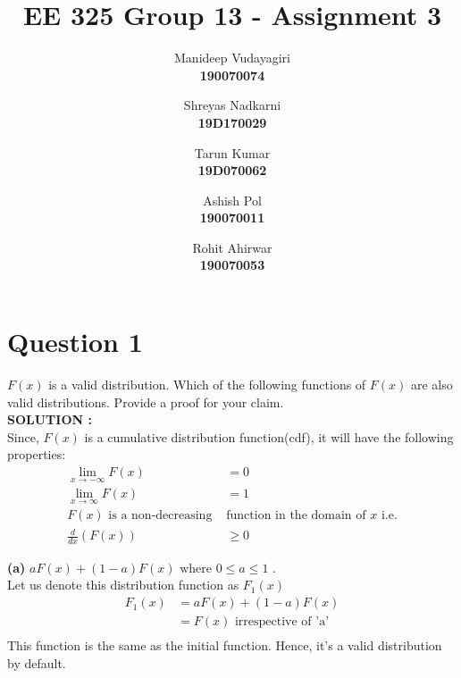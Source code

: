 \documentclass{article}
\begin{document}
\title{EE 325 Group 13 - Assignment 3 }
\author{
    Manideep Vudayagiri\\
    \textbf{190070074}
    \and
    Shreyas Nadkarni\\
    \textbf{19D170029}
    \and
    Tarun Kumar\\
    \textbf{19D070062}
    \and
    Ashish Pol\\
    \textbf{190070011}
    \and
    Rohit Ahirwar\\
    \textbf{190070053}
    
    
}

\maketitle
\tableofcontents
\thispagestyle{empty}
\clearpage
{}

\newpage

\section{Question 1}
\label{Q1}
 $F(x)$ is a valid distribution. Which of the following functions of $F(x)$ are also valid
distributions. Provide a proof for your claim.\\

\hspace{1em} \large{\textbf{SOLUTION :}} \\
Since, $F(x)$ is a cumulative distribution function(cdf), it will have the following properties:
\begin{align}
    \lim_{x\to -\infty} F(x) &= 0\\
    \lim_{x\to \infty} F(x) &= 1\\ 
    \text{$F(x)$ is a non-decreasing }& \text{function in the domain of $x$ i.e.}\nonumber\\
    \frac{d}{dx}(F(x)) & \geq 0
\end{align}
    
\textbf{(a)} $aF(x) + (1 - a)F(x) \text{ where } 0 \leq a \leq 1$ .\\

Let us denote this distribution function as $F_1(x)$
\begin{align*}
    F_1(x) &= a F(x) + (1 - a)F(x)\\
    &=F(x) \text{ irrespective of 'a'}\\
\end{align*}
This function is the same as the initial function. Hence, it's a valid distribution by default.\\
\end{document}
